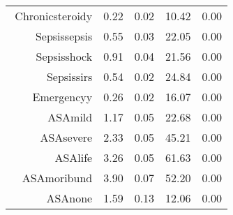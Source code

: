 \begin{tabular}{rrrrr}
$$  Chronic\-steroid\-y & 0.22 & 0.02 & 10.42 & 0.00 \\ 
  Sepsis\-sepsis & 0.55 & 0.03 & 22.05 & 0.00 \\ 
  Sepsis\-shock & 0.91 & 0.04 & 21.56 & 0.00 \\ 
  Sepsis\-sirs & 0.54 & 0.02 & 24.84 & 0.00 \\ 
  Emergency\-y & 0.26 & 0.02 & 16.07 & 0.00 \\ 
  ASA\-mild & 1.17 & 0.05 & 22.68 & 0.00 \\ 
  ASA\-severe & 2.33 & 0.05 & 45.21 & 0.00 \\ 
  ASA\-life & 3.26 & 0.05 & 61.63 & 0.00 \\ 
  ASA\-moribund & 3.90 & 0.07 & 52.20 & 0.00 \\ 
  ASA\-none & 1.59 & 0.13 & 12.06 & 0.00 \\ 
   \hline
\end{tabular}

